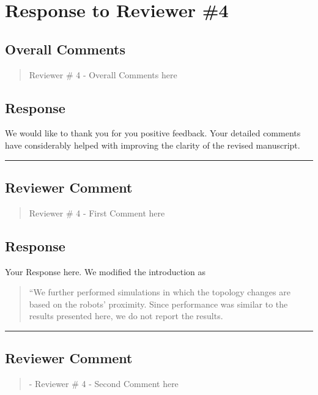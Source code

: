 
\section{Response to Reviewer \#4}
\subsection*{Overall Comments}
\begin{mdframed}
\begin{quote}
	 Reviewer \# 4 - Overall Comments here
\end{quote}
\end{mdframed}

\subsection{Response} 
We would like to thank you for you positive feedback. Your detailed comments have considerably helped with improving the clarity of the revised manuscript.

\noindent\rule{17cm}{2.0pt}

\subsection{Reviewer Comment}
\begin{mdframed}
\begin{quote}
	Reviewer \# 4 - First Comment here
\end{quote}
\end{mdframed}

\subsection{Response} 
Your Response here. We modified the introduction as

\begin{quote}
	``We further performed simulations in which the topology changes are based on the robots' proximity. Since performance was similar to the results presented here, we do not report the results.
\end{quote}

\noindent\rule{17cm}{2.0pt}

\subsection{Reviewer Comment}
\begin{mdframed}
\begin{quote}
	- Reviewer \# 4 - Second Comment here
\end{quote}
\end{mdframed}

